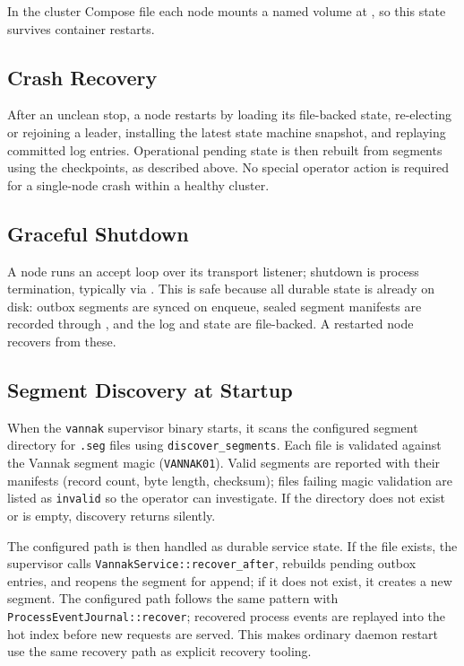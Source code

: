 In the cluster Compose file each node mounts a named volume at ,
so this state survives container restarts.

\subsection{Crash Recovery}

After an unclean stop, a node restarts by loading its file-backed \raft{} state,
re-electing or rejoining a leader, installing the latest state machine snapshot,
and replaying committed log entries. Operational pending state is then rebuilt
from segments using the checkpoints, as described above. No special operator
action is required for a single-node crash within a healthy cluster.

\subsection{Graceful Shutdown}

A node runs an accept loop over its transport listener; shutdown is process
termination, typically via .
This is safe because all durable state is already on disk: outbox segments are
synced on enqueue, sealed segment manifests are recorded through \raft{}, and
the \raft{} log and state are file-backed. A restarted node recovers from these.

\subsection{Segment Discovery at Startup}

When the \texttt{vannak} supervisor binary starts, it scans the configured
segment directory for \texttt{.seg} files using \texttt{discover\_segments}.
Each file is validated against the Vannak segment magic (\texttt{VANNAK01}).
Valid segments are reported with their manifests (record count, byte length,
checksum); files failing magic validation are listed as \texttt{invalid} so the
operator can investigate. If the directory does not exist or is empty,
discovery returns silently.

The configured  path is then handled as durable service
state. If the file exists, the supervisor calls
\texttt{VannakService::recover\_after}, rebuilds pending outbox entries, and
reopens the segment for append; if it does not exist, it creates a new segment.
The configured  path follows the same pattern with
\texttt{ProcessEventJournal::recover}; recovered process events are replayed
into the hot index before new requests are served. This makes ordinary daemon
restart use the same recovery path as explicit recovery tooling.

